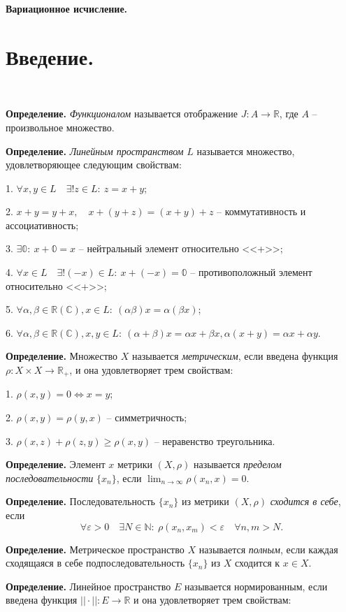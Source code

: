 \documentclass[9pt]{article}
\begin{document}
\begin{center}
    \huge\textbf{Вариационное исчисление.}
\end{center}

\section{Введение.}

\par\ 
\par\textbf{Определение.} \textit{Функционалом} называется отображение \(J:A\to \mathbb{R}\), где \(A\) -- произвольное множество.
\par\textbf{Определение.} \textit{Линейным пространством} \(L\) называется множество, удовлетворяющее следующим свойствам:
\par1. \(\forall x, y \in L\quad\exists! z \in L:\ z = x + y\);
\par2. \(x+y=y+x,\quad x+(y+z)=(x+y)+z\) -- коммутативность и ассоциативность;
\par3. \(\exists \mathbb{0}:\ x+\mathbb{0}=x\) -- нейтральный элемент относительно <<+>>;
\par4. \(\forall x \in L \quad \exists! (-x) \in L:\ x+(-x)=\mathbb{0}\) -- противоположный элемент относительно <<+>>;
\par5. \(\forall \alpha,\beta\in\mathbb{R(C)}, x\in L:\ (\alpha\beta)x=\alpha(\beta x)\);
\par6. \(\forall \alpha,\beta\in\mathbb{R(C)}, x,y\in L:\ (\alpha+\beta)x=\alpha x + \beta x, \alpha(x+y)=\alpha x + \alpha y\).
\par\textbf{Определение.} Множество \(X\) называется \textit{метрическим}, если введена функция \(\rho: X\times X\to \mathbb{R_+}\), и она удовлетворяет трем свойствам:
\par1. \(\rho(x,y)=0 \Leftrightarrow x = y\);
\par2. \(\rho(x,y)=\rho(y,x)\) -- симметричность;
\par3. \(\rho(x,z) + \rho(z,y) \ge \rho(x,y)\) -- неравенство треугольника.
\par\textbf{Определение.} Элемент \(x\) метрики \((X, \rho)\) называется \textit{пределом последовательности} \(\{x_n\}\), если \(\displaystyle\lim_{n\to\infty}\rho(x_n,x)=0\).
\par\textbf{Определение.} Последовательность \(\{x_n\}\) из метрики \((X, \rho)\) \textit{сходится в себе}, если \[\forall\varepsilon>0\quad\exists N \in \mathbb{N}:\ \rho(x_n,x_m)<\varepsilon\quad\forall n,m>N.\]
\par\textbf{Определение.} Метрическое пространство \(X\) называется \textit{полным}, если каждая сходящаяся в себе подпоследовательность \(\{x_n\}\) из \(X\) сходится к \(x\in X\).
\par\textbf{Определение.} Линейное пространство \(E\) называется нормированным, если введена функция \(||\cdot||:E\to\mathbb{R}\) и она удовлетворяет трем свойствам:
\end{document}

